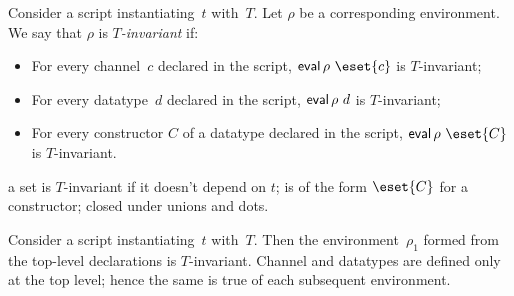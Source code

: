 






\begin{definition}
Consider a script instantiating~$t$ with~$T$.  Let $\rho$ be a corresponding
environment.  We say that $\rho$ is \emph{$T$-invariant} if:
%
\begin{itemize}
\item For every channel~$c$ declared in the script, $\eval \rho ~ \eset{c}$
  is $T$-invariant;

\item For every datatype~$d$ declared in the script, $\mathop{\sf eval} \rho ~ d$ is
  $T$-invariant;

\item For every constructor $C$ of a datatype declared in the script,
  $\eval \rho ~ \eset{C}$  is $T$-invariant.
\end{itemize}
\end{definition}

 a set is $T$-invariant if it doesn't depend on $t$; is of the
form $\eset{C}$ for a constructor; closed under unions and dots.  


\begin{lemma}
\label{lem:T-invariant}
Consider a script instantiating~$t$ with~$T$.  Then  the environment~$\rho_1$
formed from the top-level declarations is $T$-invariant. 
%
%
Channel and datatypes are defined only at the top level; hence the same is
true of each subsequent environment. 
\end{lemma}

